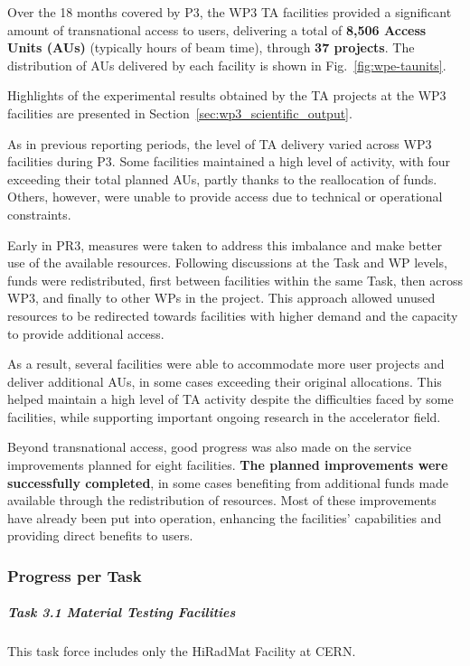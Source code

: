 Over the 18 months covered by P3, the WP3 TA facilities provided a significant amount of transnational access to users, delivering a total of \textbf{8,506 Access Units (AUs)} (typically hours of beam time), through \textbf{37 projects}. The distribution of AUs delivered by each facility is shown in Fig.~\ref{fig:wpe-taunits}.

Highlights of the experimental results obtained by the TA projects at the WP3 facilities are presented in Section~\ref{sec:wp3_scientific_output}.

As in previous reporting periods, the level of TA delivery varied across WP3 facilities during P3. Some facilities maintained a high level of activity, with four exceeding their total planned AUs, partly thanks to the reallocation of funds. Others, however, were unable to provide access due to technical or operational constraints.

Early in PR3, measures were taken to address this imbalance and make better use of the available resources. Following discussions at the Task and WP levels, funds were redistributed, first between facilities within the same Task, then across WP3, and finally to other WPs in the project. This approach allowed unused resources to be redirected towards facilities with higher demand and the capacity to provide additional access.

As a result, several facilities were able to accommodate more user projects and deliver additional AUs, in some cases exceeding their original allocations. This helped maintain a high level of TA activity despite the difficulties faced by some facilities, while supporting important ongoing research in the accelerator field.

Beyond transnational access, good progress was also made on the service improvements planned for eight facilities. \textbf{The planned improvements were successfully completed}, in some cases benefiting from additional funds made available through the redistribution of resources. Most of these improvements have already been put into operation, enhancing the facilities' capabilities and providing direct benefits to users.

\subsubsection*{Progress per Task}

\subparagraph{Task 3.1 Material Testing Facilities} \mbox{}

This task force includes only the HiRadMat Facility at CERN. 

